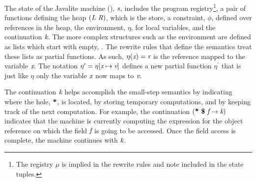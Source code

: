 The state of the Javalite machine (),
$\emph{s}$, includes the program registry\footnote{The registry $\mu$
  is implied in the rewrite rules and note included in the state tuples.}, a pair of functions defining the heap
$(\emph{L}\ \emph{R})$, which is the store, a constraint,
$\phi$, defined over references in the heap, the environment, $\eta$,
for local variables, and the continuation $\emph{k}$. The more
complex structures such as the environment are defined as lists which
start with empty, . The rewrite rules that define the
semantics treat these lists as partial functions. As such,
$\eta(\emph{x}) = \emph{r}$ is the reference mapped to the variable
$\emph{x}$. The notation $\eta^\prime = \eta[\emph{x} \mapsto
  \emph{v}]$ defines a new partial function $\eta^\prime$ that is
just like $\eta$ only the variable $\emph{x}$ now maps to
$\emph{v}$.

The continuation $\emph{k}$ helps accomplish the small-step semantics
by indicating where the hole, $\textbf{*}$, is located, by storing
temporary computations, and by keeping track of the next
computation. For example, the continuation
$\lp\cfgt{*}\ \cfgt{\$}\ \cfgnt{f} \rightarrow \cfgnt{k}\rp$ indicates
that the machine is currently computing the expression for the object
reference on which the field $\emph{f}$ is going to be accessed. Once
the field access is complete, the machine continues with $\emph{k}$.




